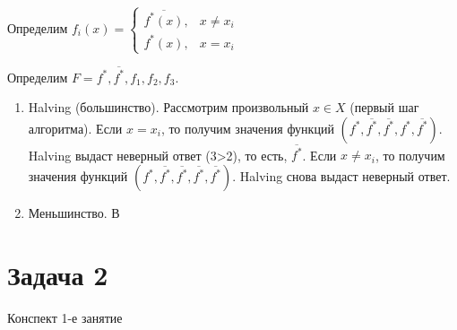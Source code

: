 \documentclass[a4paper]{article}
\begin{document}
Определим $f_i(x)=\begin{cases}
\overline{f^*(x)},&x\neq x_i\\
f^*(x),&x=x_i
\end{cases}$

Определим $F={f^*, \overline{f^*}, f_1, f_2, f_3}$.

\begin{enumerate}
\item Halving (большинство). Рассмотрим произвольный $x\in X$ (первый шаг алгоритма). Если $x=x_i$, то получим значения функций $(f^*, \overline{f^*}, \overline{f^*},f^*,\overline{f^*})$. Halving выдаст неверный ответ (3>2), то есть, $\overline{f^*}$. Если $x\neq x_i$, то получим значения функций $(f^*, \overline{f^*}, \overline{f^*},\overline{f^*},\overline{f^*})$. Halving снова выдаст неверный ответ.
\item Меньшинство. В 
\end{enumerate}
\section*{Задача 2}
Конспект 1-е занятие
\end{document}
